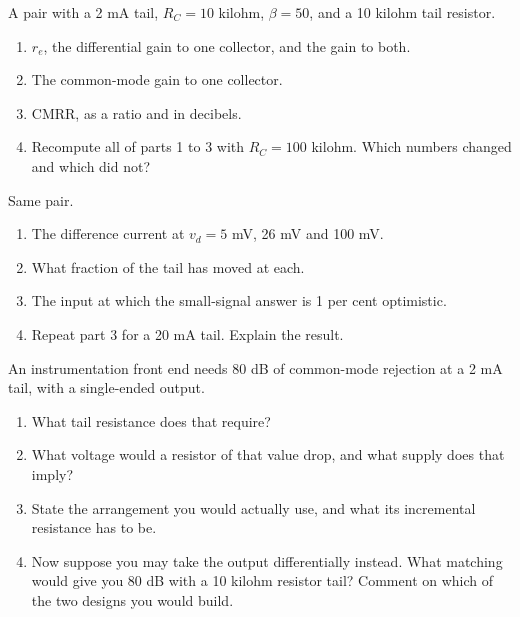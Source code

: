 \label{c9:ex:3}
A pair with a 2 mA tail, $R_C = 10$ kilohm, $\beta = 50$, and a 10 kilohm tail resistor.

\begin{enumerate}
  \item $r_e$, the differential gain to one collector, and the gain to both.
  \item The common-mode gain to one collector.
  \item CMRR, as a ratio and in decibels.
  \item Recompute all of parts 1 to 3 with $R_C = 100$ kilohm. Which numbers changed and which did not?
\end{enumerate}

\label{c9:ex:4}
Same pair.

\begin{enumerate}
  \item The difference current at $v_d = 5$ mV, 26 mV and 100 mV.
  \item What fraction of the tail has moved at each.
  \item The input at which the small-signal answer is 1 per cent optimistic.
  \item Repeat part 3 for a 20 mA tail. Explain the result.
\end{enumerate}

\label{c9:ex:5}
An instrumentation front end needs 80 dB of common-mode rejection at a 2 mA tail, with a single-ended output.

\begin{enumerate}
  \item What tail resistance does that require?
  \item What voltage would a resistor of that value drop, and what supply does that imply?
  \item State the arrangement you would actually use, and what its incremental resistance has to be.
  \item Now suppose you may take the output differentially instead. What matching would give you 80 dB with a 10 kilohm resistor tail? Comment on which of the two designs you would build.
\end{enumerate}

